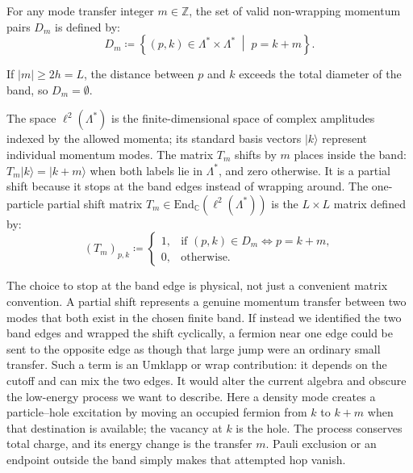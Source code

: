 \begin{definition}
For any mode transfer integer $m \in \mathbb{Z}$, the set of valid non-wrapping momentum pairs $D_m$ is defined by:
\begin{equation}
D_m \coloneqq \left\{ (p, k) \in \Lambda^* \times \Lambda^* \;\middle|\; p = k + m \right\}.
\end{equation}
\end{definition}

If $|m| \ge 2h = L$, the distance between $p$ and $k$ exceeds the total diameter of the band, so $D_m = \emptyset$.

\begin{definition}
The space $\ell^2(\Lambda^*)$ is the finite-dimensional space of complex amplitudes indexed by the allowed momenta; its standard basis vectors $|k\rangle$ represent individual momentum modes. The matrix $T_m$ shifts by $m$ places inside the band: $T_m|k\rangle=|k+m\rangle$ when both labels lie in $\Lambda^*$, and zero otherwise. It is a partial shift because it stops at the band edges instead of wrapping around.
The one-particle partial shift matrix $T_m \in \mathrm{End}_{\mathbb{C}}(\ell^2(\Lambda^*))$ is the $L \times L$ matrix defined by:
\begin{equation}
(T_m)_{p, k} \coloneqq \begin{cases}
1, & \text{if } (p, k) \in D_m \iff p = k + m, \\
0, & \text{otherwise}.
\end{cases}
\end{equation}
\end{definition}

The choice to stop at the band edge is physical, not just a convenient
matrix convention. A partial shift represents a genuine momentum transfer
between two modes that both exist in the chosen finite band. If instead we
identified the two band edges and wrapped the shift cyclically, a fermion
near one edge could be sent to the opposite edge as though that large jump
were an ordinary small transfer. Such a term is an Umklapp or wrap
contribution: it depends on the cutoff and can mix the two edges. It would
alter the current algebra and obscure the low-energy process we want to
describe. Here a density mode creates a particle--hole excitation by moving
an occupied fermion from $k$ to $k+m$ when that destination is available;
the vacancy at $k$ is the hole. The process conserves total charge, and its
energy change is the transfer $m$. Pauli exclusion or an endpoint outside
the band simply makes that attempted hop vanish.


